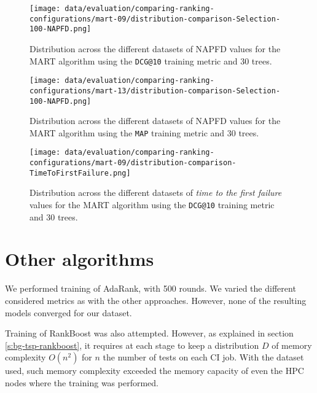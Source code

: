 \begin{figure}
    \centering
    \begin{minipage}{.45\textwidth}
        \centering
        \label{fig:mart-09-napfd}
        \texttt{[image: data/evaluation/comparing-ranking-configurations/mart-09/distribution-comparison-Selection-100-NAPFD.png]}
        \parbox{0.9\textwidth}{\caption{Distribution across the different datasets of NAPFD values for the MART algorithm using the \texttt{DCG@10} training metric and 30 trees.}}
    \end{minipage}%
    \begin{minipage}{.45\textwidth}
        \centering
        \label{fig:mart-13-napfd}
        \texttt{[image: data/evaluation/comparing-ranking-configurations/mart-13/distribution-comparison-Selection-100-NAPFD.png]}
        \parbox{0.9\textwidth}{\caption{Distribution across the different datasets of NAPFD values for the MART algorithm using the \texttt{MAP} training metric and 30 trees.}}
    \end{minipage}%
\end{figure}
\begin{figure}
    \centering
    \begin{minipage}{.45\textwidth}
        \centering
        \label{fig:mart-09-tff}
        \texttt{[image: data/evaluation/comparing-ranking-configurations/mart-09/distribution-comparison-TimeToFirstFailure.png]}
        \parbox{0.9\textwidth}{\caption{Distribution across the different datasets of \emph{time to the first failure} values for the MART algorithm using the \texttt{DCG@10} training metric and 30 trees.}}
    \end{minipage}%
\end{figure}

\section{Other algorithms}

We performed training of AdaRank, with 500 rounds. We varied the different considered metrics as with
the other approaches. However, none of the resulting models converged for our dataset.

Training of RankBoost was also attempted. However, as explained in section \ref{s:bg-tsp-rankboost},
it requires at each stage to keep a distribution $D$ of memory complexity $O(n^2)$ for $n$ the number of tests
on each CI job. With the dataset used, such memory complexity exceeded the memory capacity of even the HPC nodes 
where the training was performed.